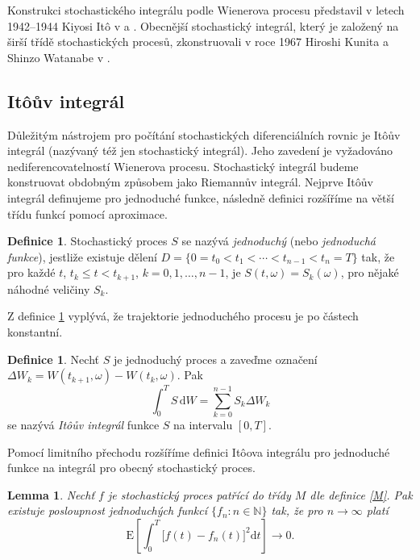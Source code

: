 \documentclass[a4paper,12pt]{report}
\newtheorem{lemma}[veta]{Lemma}
\theoremstyle{definition} \newtheorem{definice}[veta]{Definice}
\theoremstyle{remark}
\begin{document}
Konstrukci stochastického integrálu podle Wienerova procesu představil v letech 1942--1944 Kiyosi It\^o v \cite{ito1942differential} a \cite{ito1944}. 
Obecnější stochastický integrál, který je založený na širší třídě stochastických procesů, zkonstruovali v roce 1967 Hiroshi Kunita a Shinzo Watanabe v \cite{kunita1967square}.

\subsection{It\^oův integrál}\label{Ito_integral}
Důležitým nástrojem pro počítání stochastických diferenciálních rovnic je It\^oův integrál (nazývaný též jen stochastický integrál).
Jeho zavedení je vyžadováno nediferencovatelností Wienerova procesu.
Stochastický integrál budeme konstruovat obdobným způsobem jako Riemannův integrál.
Nejprve It\^oův integrál definujeme pro jednoduché funkce, následně definici rozšíříme na větší třídu funkcí pomocí aproximace.

\begin{definice}\label{jednoduchafunkce}
Stochastický proces $S$ se nazývá \textit{jednoduchý} (nebo \textit{jednoduchá funkce}), jestliže existuje dělení $D=\{0=t_0<t_1<\cdots<t_{n-1}<t_n=T\}$ tak, že pro každé $t$, $t_k\le t<t_{k+1}$, $k=0,1,\dots,n-1$, je $S(t,\omega)=S_k(\omega)$, pro nějaké náhodné veličiny $S_k$. 
\end{definice}
Z definice \ref{jednoduchafunkce} vyplývá, že trajektorie jednoduchého procesu je po částech konstantní. 

\begin{definice}
Nechť $S$ je jednoduchý proces a zaveďme označení \linebreak$\Delta W_k=W(t_{k+1},\omega)-W(t_k,\omega)$.
Pak
$$\int_0^TS\,\mathrm{d}W=\sum_{k=0}^{n-1}S_k\Delta W_k$$
se nazývá \textit{It\^oův integrál} funkce $S$ na intervalu $[0,T]$.
\end{definice}

Pomocí limitního přechodu rozšíříme definici It\^oova integrálu pro jednoduché funkce na integrál pro obecný stochastický proces.

\begin{lemma} \label{itoint}
Nechť $f$ je stochastický proces patřící do třídy $M$ dle definice \ref{M}.
Pak existuje posloupnost jednoduchých funkcí $\{f_n:n\in\mathbb N\}$ tak, že pro $n\to\infty$ platí
$$\mathrm{E}\left[\int_0^T\big[f(t)-f_n(t)\big]^2\mathrm{d}t\right]\longrightarrow0.$$
\end{lemma}
\end{document}
